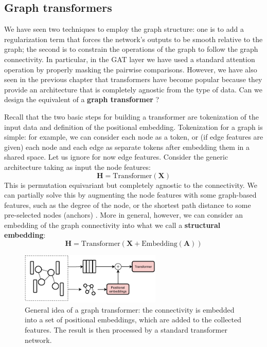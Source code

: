 \subsection{Graph transformers}

We have seen two techniques to employ the graph structure: one is to add a regularization term that forces the network’s outputs to be smooth relative to the graph; the second is to constrain the operations of the graph to follow the graph connectivity. In particular, in the GAT layer we have used a standard attention operation by properly masking the pairwise comparisons. However, we have also seen in the previous chapter that transformers have become popular because they provide an architecture that is completely agnostic from the type of data. Can we design the equivalent of a \textbf{graph transformer} \cite{muller2023attending}?

Recall that the two basic steps for building a transformer are tokenization of the input data and definition of the positional embedding. Tokenization for a graph is simple: for example, we can consider each node as a token, or (if edge features are given) each node and each edge as separate tokens after embedding them in a shared space. Let us ignore for now edge features. Consider the generic architecture taking as input the node features:
%
$$
\mathbf{H} = \text{Transformer}(\mathbf{X})
$$
%
This is permutation equivariant but completely agnostic to the connectivity. We can partially solve this by augmenting the node features with some graph-based features, such as the degree of the node, or the shortest path distance to some pre-selected nodes (anchors) \cite{rampavsek2022recipe,muller2023attending}. More in general, however, we can consider an embedding of the graph connectivity  into what we call a \textbf{structural embedding}:
%
$$
\mathbf{H} = \text{Transformer}(\mathbf{X} + \text{Embedding}(\mathbf{A}))
$$

\begin{figure}
    \centering
    \hspace{1em}\includegraphics[width=0.6\textwidth]{images/graph_transformer}
    \caption{General idea of a graph transformer: the connectivity is embedded into a set of positional embeddings, which are added to the collected features. The result is then processed by a standard transformer network.}
    \label{fig:graph_transformer}
\end{figure}

